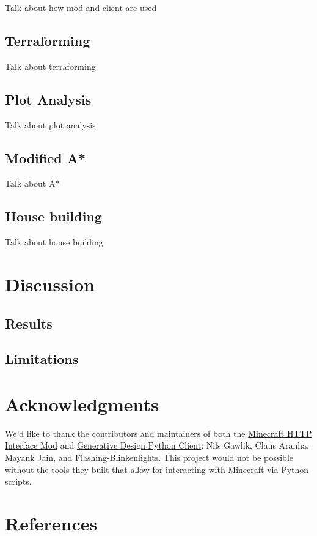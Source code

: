 \documentclass[11pt, oneside]{article}
\begin{document}
\begin{normalsize}
Talk about how mod and client are used

\subsection{Terraforming}

Talk about terraforming

\subsection{Plot Analysis}

Talk about plot analysis

\subsection{Modified A*}

Talk about A*

\subsection{House building}

Talk about house building

\section{Discussion}
\label{Discussion}

\subsection{Results}

\subsection{Limitations}


\section{Acknowledgments}
\label{Acknowledgments}

We'd like to thank the contributors and maintainers of both the \href{https://github.com/nilsgawlik/gdmc_http_interface}{Minecraft HTTP Interface Mod} and \href{https://github.com/nilsgawlik/gdmc_http_client_python}{Generative Design Python Client}: Nils Gawlik, Claus Aranha, Mayank Jain, and Flashing-Blinkenlights. This project would not be possible without the tools they built that allow for interacting with Minecraft via Python scripts.

\section{References}
\label{references}
\nocite{*}
\printbibliography[heading=none]

\end{normalsize}
\end{document}
